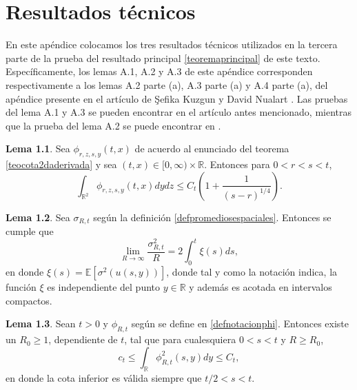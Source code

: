 \documentclass[letterpaper,twoside,12pt]{book}
\newcommand{\R}{\mathbb{R}}
\newcommand{\E}{\mathbb{E}}
\newcommand{\1}{\mathds{1}}
\renewcommand{\to}{\rightarrow}
\theoremstyle{definition}
\theoremstyle{definition}
\theoremstyle{remark}
\theoremstyle{definition}
\theoremstyle{definition}
\theoremstyle{definition}
\theoremstyle{definition}
\theoremstyle{definition}
\newtheorem{lema}{Lema}
\begin{document}
\chapter{Resultados técnicos}
En este apéndice colocamos los tres resultados técnicos utilizados en la tercera parte de la prueba del resultado principal \ref{teoremaprincipal} de este texto.  Específicamente, los lemas A.1, A.2 y A.3 de este apéndice corresponden respectivamente a los lemas A.2 parte (a), A.3 parte (a) y A.4 parte (a), del apéndice presente en el artículo de \c{S}efika Kuzgun y David Nualart \cite{KUZGUN202268}. Las pruebas del lema A.1 y A.3 se pueden encontrar en el artículo antes mencionado, mientras que la prueba del lema A.2 se puede encontrar en \cite[proposición 3.1]{HUANG20207170}.

\begin{lema}\label{lemaA.2}
 Sea $\phi_{r,z,s,y}(t,x)$ de acuerdo al enunciado del teorema \ref{teocota2daderivada} y sea $(t,x)\in [0,\infty)\times\R$. Entonces para $0<r<s<t$,
 \[
 \int_{\R^2}\phi_{r,z,s,y}(t,x)dydz\leq C_t \left(1+\frac{1}{(s-r)^{1/4}}\right).
 \]
 \end{lema}
 \begin{lema}\label{lemaA.3a} 
  Sea $\sigma_{R,t}$ según la definición \ref{defpromediosespaciales}. Entonces se cumple que 
  \[
      \lim_{R\to\infty}\frac{\sigma_{R,t}^2}{R}=2\int_{0}^{t}\xi(s)ds,
  \] 
  en donde $\xi(s)=\E\left[\sigma^2(u(s,y))\right]$, donde tal y como la notación indica, la función $\xi$ es independiente del punto $y\in \R$ y además es acotada en intervalos compactos.
  \end{lema}
  \begin{lema}\label{LemaA.4a}
   Sean $t>0$ y $\phi_{R,t}$ según se define en \eqref{defnotacionphi}. Entonces existe un $R_0\geq1$, dependiente de $t$, tal que para cualesquiera $0<s<t$ y $R\geq R_0$,
   \[
      c_t\leq \int_\R\phi_{R,t}^2(s,y)dy\leq C_t,
   \]
   en donde la cota inferior es válida siempre que $t/2<s<t$.
  \end{lema}
\nocite{*}
\backmatter


\end{document}
